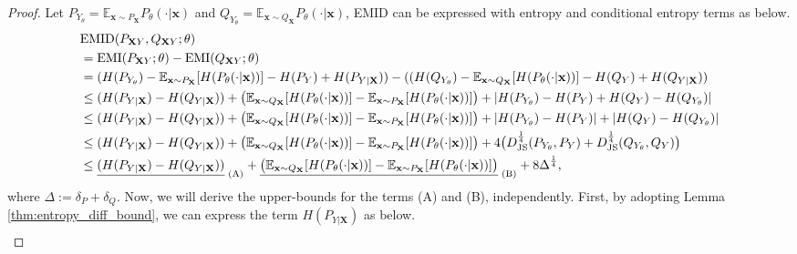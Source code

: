 \begin{proof} Let $P_{Y_{\theta}}=\mathbb{E}_{\mathbf{x}\sim P_{\mathbf{X}}}P_{\theta}(\cdot|\mathbf{x})$ and $Q_{Y_{\theta}}=\mathbb{E}_{\mathbf{x}\sim Q_{\mathbf{X}}}P_{\theta}(\cdot|\mathbf{x})$, EMID can be expressed with entropy and conditional entropy terms as below.
\begin{align} \label{thm:proof_emid_decom}
&\text{EMID}(P_{\mathbf{X}Y},Q_{\mathbf{X}Y};\theta) \nonumber\\
&= \text{EMI}(P_{\mathbf{X}Y};\theta) - \text{EMI}(Q_{\mathbf{X}Y};\theta) \nonumber\\
&=(H(P_{Y_{\theta}}) - \mathbb{E}_{\mathbf{x}\sim P_{\mathbf{X}}}[H(P_{\theta}(\cdot|\mathbf{x}))] - H(P_Y) + H(P_{Y|\mathbf{X}})) - ((H(Q_{Y_{\theta}}) - \mathbb{E}_{\mathbf{x}\sim Q_{\mathbf{X}}}[H(P_{\theta}(\cdot|\mathbf{x}))] - H(Q_Y) + H(Q_{Y|\mathbf{X}})) \nonumber\\
&\leq (H(P_{Y|\mathbf{X}}) - H(Q_{Y|\mathbf{X}})) + \big(\mathbb{E}_{\mathbf{x}\sim Q_{\mathbf{X}}}[H(P_{\theta}(\cdot|\mathbf{x}))] - \mathbb{E}_{\mathbf{x}\sim P_{\mathbf{X}}}[H(P_{\theta}(\cdot|\mathbf{x}))]\big) + |H(P_{Y_{\theta}})  - H(P_Y) + H(Q_Y) - H(Q_{Y_{\theta}})| \nonumber\\
&\leq (H(P_{Y|\mathbf{X}}) - H(Q_{Y|\mathbf{X}})) + \big(\mathbb{E}_{\mathbf{x}\sim Q_{\mathbf{X}}}[H(P_{\theta}(\cdot|\mathbf{x}))] - \mathbb{E}_{\mathbf{x}\sim P_{\mathbf{X}}}[H(P_{\theta}(\cdot|\mathbf{x}))]\big) + |H(P_{Y_{\theta}})  - H(P_Y)| + | H(Q_Y) - H(Q_{Y_{\theta}})| \nonumber\\
&\leq (H(P_{Y|\mathbf{X}}) - H(Q_{Y|\mathbf{X}})) + \big(\mathbb{E}_{\mathbf{x}\sim Q_{\mathbf{X}}}[H(P_{\theta}(\cdot|\mathbf{x}))] - \mathbb{E}_{\mathbf{x}\sim P_{\mathbf{X}}}[H(P_{\theta}(\cdot|\mathbf{x}))]\big) + 4\big( D^{\frac{1}{4}}_{\rm JS}(P_{Y_{\theta}},P_Y) + D^{\frac{1}{4}}_{\rm JS}(Q_{Y_{\theta}},Q_Y)\big) \nonumber\\
&\leq \underline{(H(P_{Y|\mathbf{X}}) - H(Q_{Y|\mathbf{X}}))}_{\text{ (A)}} + \underline{\big(\mathbb{E}_{\mathbf{x}\sim Q_{\mathbf{X}}}[H(P_{\theta}(\cdot|\mathbf{x}))] - \mathbb{E}_{\mathbf{x}\sim P_{\mathbf{X}}}[H(P_{\theta}(\cdot|\mathbf{x}))]\big)}_{\text{ (B)}} + 8\Delta^{\frac{1}{4}},
\end{align}
where $\Delta:=\delta_{P}+\delta_{Q}$. Now, we will derive the upper-bounds for the terms (A) and (B), independently. First, by adopting Lemma \ref{thm:entropy_diff_bound}, we can express the term $H(P_{Y|\mathbf{X}})$ as below.
\begin{align*}

\end{align*}
\end{proof}
